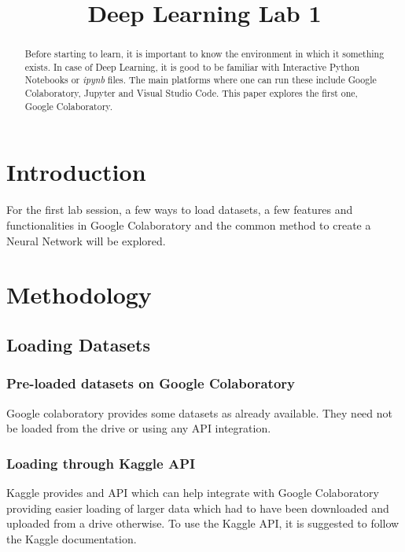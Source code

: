 \documentclass[conference,compsoc]{IEEEtran}
\begin{document}
\title{Deep Learning Lab 1}
\author{}

\maketitle
\begin{abstract}
    Before starting to learn, it is important to know the environment in which it something exists. In case of Deep Learning, it is good to be familiar with Interactive Python Notebooks or \textit{ipynb} files. The main platforms where one can run these include Google Colaboratory, Jupyter and Visual Studio Code. This paper explores the first one, Google Colaboratory.
\end{abstract}

\section{Introduction}
For the first lab session, a few ways to load datasets, a few features and functionalities in Google Colaboratory and the common method to create a Neural Network will be explored.

\section{Methodology}
\subsection{Loading Datasets}

\subsubsection{Pre-loaded datasets on Google Colaboratory}
Google colaboratory provides some datasets as already available. They need not be loaded from the drive or using any API integration.

\subsubsection{Loading through Kaggle API}
Kaggle provides and API which can help integrate with Google Colaboratory providing easier loading of larger data which had to have been downloaded and uploaded from a drive otherwise. To use the Kaggle API, it is suggested to follow the Kaggle documentation.
\end{document}
